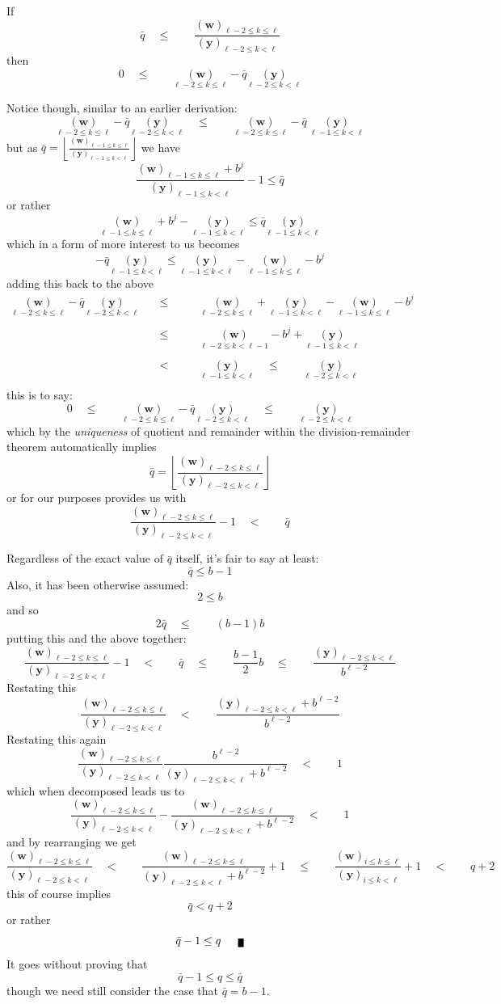 \documentclass[twoside]{article}
\renewcommand{\leq}{\ensuremath{\quad\le\qquad}}
\newcommand{\bradix}[2][u]{\ensuremath{\underset{#2}{(\bm{#1})}}}
\newcommand{\numer}[3][w]{\ensuremath{(\bm{#1})_{#2\le k\le #3}}}
\newcommand{\denom}[3][y]{\ensuremath{(\bm{#1})_{#2\le k <  #3}}}
\newcommand{\qed}{\nobreak \ifvmode \relax \else
      \ifdim\lastskip<1.5em \hskip-\lastskip
      \hskip1.5em plus0em minus0.5em \fi \nobreak
      \vrule height0.5em width0.5em depth0.25em\fi}
\begin{document}
If
$$ \bar{q}\leq\frac{\numer{\ell-2}{\ell}}{\denom{\ell-2}{\ell}} $$
then
$$ 0\leq\bradix[w]{\ell-2\le k\le\ell}-\bar{q}\bradix[y]{\ell-2\le k < \ell} $$

Notice though, similar to an earlier derivation:
$$ \bradix[w]{\ell-2\le k\le\ell}-\bar{q}\bradix[y]{\ell-2\le k < \ell}
	\leq\bradix[w]{\ell-2\le k\le\ell}-\bar{q}\ \bradix[y]{\ell-1\le k < \ell} $$
but as $ \bar{q}=\left\lfloor\frac{\numer{\ell-1}{\ell}}{\denom{\ell-1}{\ell}}\right\rfloor $ we have
$$ \frac{\numer{\ell-1}{\ell}+b^j}{\denom{\ell-1}{\ell}}-1\le\bar{q} $$
or rather
$$ \bradix[w]{\ell-1\le k\le\ell}+b^j-\bradix[y]{\ell-1\le k < \ell}\le\bar{q}\bradix[y]{\ell-1\le k < \ell} $$
which in a form of more interest to us becomes
$$ -\bar{q}\bradix[y]{\ell-1\le k < \ell}\le\bradix[y]{\ell-1\le k < \ell}-\bradix[w]{\ell-1\le k\le\ell}-b^j $$
adding this back to the above
$$ \begin{array}{rcl}
\bradix[w]{\ell-2\le k\le\ell}-\bar{q}\bradix[y]{\ell-2\le k < \ell}
	& \leq & \bradix[w]{\ell-2\le k\le\ell}+\bradix[y]{\ell-1\le k < \ell}-\bradix[w]{\ell-1\le k\le\ell}-b^j \\
\\
	& \leq & \bradix[w]{\ell-2\le k < \ell-1}-b^j+\bradix[y]{\ell-1\le k < \ell} \\
\\
	& \quad <\qquad & \bradix[y]{\ell-1\le k < \ell}\leq\bradix[y]{\ell-2\le k < \ell} \\
\end{array} $$
this is to say:
$$ 0\leq\bradix[w]{\ell-2\le k\le\ell}-\bar{q}\bradix[y]{\ell-2\le k < \ell}
	\leq\bradix[y]{\ell-2\le k < \ell} $$
which by the \emph{uniqueness} of quotient and remainder within the division-remainder theorem automatically implies
$$ \bar{q}=\left\lfloor\frac{\numer{\ell-2}{\ell}}{\denom{\ell-2}{\ell}}\right\rfloor $$
or for our purposes provides us with
$$ \frac{\numer{\ell-2}{\ell}}{\denom{\ell-2}{\ell}}-1\quad <\qquad\bar{q} $$

Regardless of the exact value of $ \bar{q} $ itself, it's fair to say at least:
$$ \bar{q}\le b-1 $$
Also, it has been otherwise assumed:
$$ 2\le b $$
and so
$$ 2\bar{q}\leq (b-1)b $$
putting this and the above together:
$$ \frac{\numer{\ell-2}{\ell}}{\denom{\ell-2}{\ell}}-1
	\quad <\qquad\bar{q}
	\leq \frac{b-1}{2}b
	\leq\frac{\denom{\ell-2}{\ell}}{b^{\ell-2}} $$
Restating this
$$ \frac{\numer{\ell-2}{\ell}}{\denom{\ell-2}{\ell}}
	\quad <\qquad \frac{\denom{\ell-2}{\ell}+b^{\ell-2}}{b^{\ell-2}} $$
Restating this again
$$ \frac{\numer{\ell-2}{\ell}}{\denom{\ell-2}{\ell}}\frac{b^{\ell-2}}{\denom{\ell-2}{\ell}+b^{\ell-2}}
	\quad <\qquad 1 $$
which when decomposed leads us to
$$ \frac{\numer{\ell-2}{\ell}}{\denom{\ell-2}{\ell}}-\frac{\numer{\ell-2}{\ell}}{\denom{\ell-2}{\ell}+b^{\ell-2}}
	\quad <\qquad 1 $$
and by rearranging we get
$$ \frac{\numer{\ell-2}{\ell}}{\denom{\ell-2}{\ell}}
	\quad <\qquad\frac{\numer{\ell-2}{\ell}}{\denom{\ell-2}{\ell}+b^{\ell-2}}+1
	\leq\frac{\numer{i}{\ell}}{\denom{i}{\ell}}+1
	\quad <\qquad q+2 $$
this of course implies
$$ \bar{q} < q+2 $$
or rather
$$ \bar{q}-1\le q\qed $$
It goes without proving that
$$ \bar{q}-1\le q\le\bar{q} $$
though we need still consider the case that $ \bar{q}=b-1 $.
\end{document}
